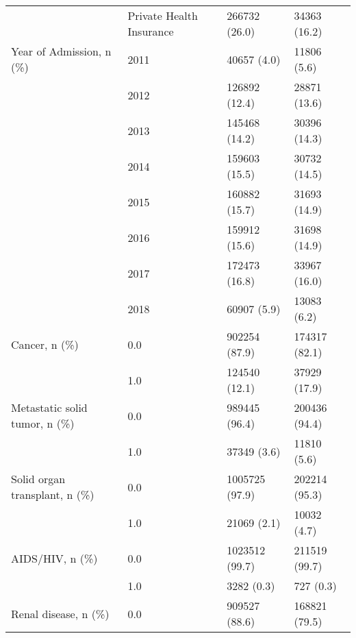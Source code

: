 \begin{tabular}{llll}
                                       & Private Health Insurance &                         266732 (26.0) &      34363 (16.2) \\
Year of Admission, n (\%) & 2011 &                           40657 (4.0) &       11806 (5.6) \\
                                       & 2012 &                         126892 (12.4) &      28871 (13.6) \\
                                       & 2013 &                         145468 (14.2) &      30396 (14.3) \\
                                       & 2014 &                         159603 (15.5) &      30732 (14.5) \\
                                       & 2015 &                         160882 (15.7) &      31693 (14.9) \\
                                       & 2016 &                         159912 (15.6) &      31698 (14.9) \\
                                       & 2017 &                         172473 (16.8) &      33967 (16.0) \\
                                       & 2018 &                           60907 (5.9) &       13083 (6.2) \\
Cancer, n (\%) & 0.0 &                         902254 (87.9) &     174317 (82.1) \\
                                       & 1.0 &                         124540 (12.1) &      37929 (17.9) \\
Metastatic solid tumor, n (\%) & 0.0 &                         989445 (96.4) &     200436 (94.4) \\
                                       & 1.0 &                           37349 (3.6) &       11810 (5.6) \\
Solid organ transplant, n (\%) & 0.0 &                        1005725 (97.9) &     202214 (95.3) \\
                                       & 1.0 &                           21069 (2.1) &       10032 (4.7) \\
AIDS/HIV, n (\%) & 0.0 &                        1023512 (99.7) &     211519 (99.7) \\
                                       & 1.0 &                            3282 (0.3) &         727 (0.3) \\
Renal disease, n (\%) & 0.0 &                         909527 (88.6) &     168821 (79.5) \\

\end{tabular}
